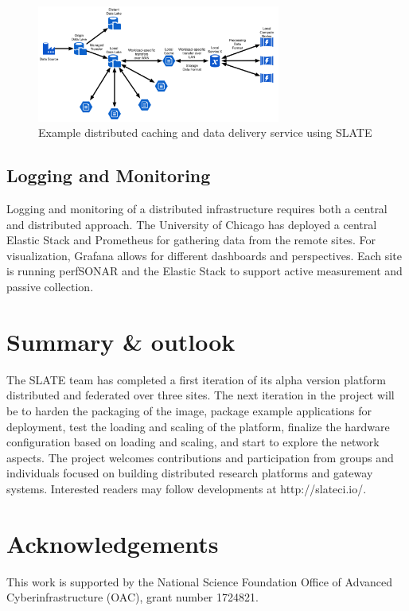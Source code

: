 \documentclass[sigconf]{acmart}
\begin{document}
\begin{figure}
    \includegraphics[width=8cm]{data-lake2.png}
    \caption{Example distributed caching and data delivery service  using SLATE}
    \label{fig:data_lakes}
\end{figure}


\subsection{Logging and Monitoring}

Logging and monitoring of a distributed infrastructure requires both a central and distributed approach.  The University of Chicago has deployed a central Elastic Stack\cite{ElasticStack} and Prometheus\cite{Prometheus} for gathering data from the remote sites.  For visualization, Grafana allows for different dashboards and perspectives.  Each site is running perfSONAR and the Elastic Stack to support active measurement and passive collection.  

\section{Summary \& outlook}

The SLATE team has completed a first iteration of its alpha version platform distributed and federated over three sites.  The next iteration in the project will be to harden the packaging of the image, package example applications for deployment, test the loading and scaling of the platform, finalize the hardware configuration based on loading and scaling, and start to explore the network aspects.  The project welcomes contributions and participation from groups and individuals focused on building distributed research platforms and gateway systems. Interested readers may follow developments at http://slateci.io/. 

\section*{Acknowledgements}

This work is supported by the National Science Foundation Office of Advanced Cyberinfrastructure (OAC), grant number 1724821.



\end{document}
